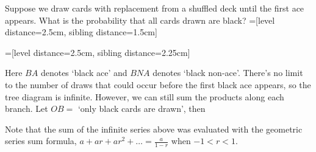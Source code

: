 \begin{examp}
Suppose we draw cards with replacement from a shuffled deck until the first ace appears. What is the probability that all cards drawn are black?
=[level distance=2.5cm, sibling distance=1.5cm]
\begin{center}
=[level distance=2.5cm, sibling distance=2.25cm]
\end{center}
\par
\noindent Here $BA$ denotes `black ace' and $BNA$ denotes `black non-ace'. There's no limit to the number of draws that could occur before the first black ace appears, so the tree diagram is infinite. However, we can still sum the products along each branch. Let $OB = $ `only black cards are drawn', then
\end{examp}
\par
Note that the sum of the infinite series above was evaluated with the geometric series sum formula, $a+ar+ar^2+ \dots = \frac{a}{1-r}$ when $-1 < r < 1$.

